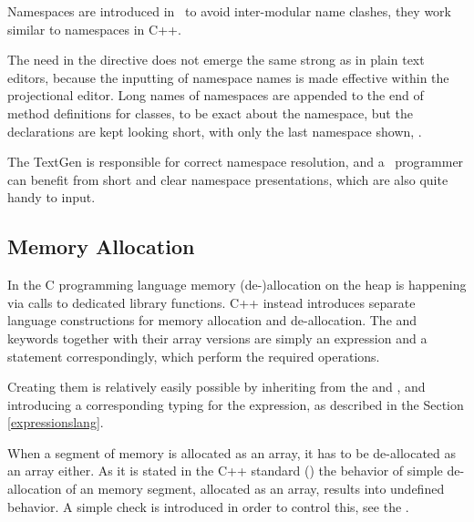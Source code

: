 Namespaces are introduced in \pcpp\ to avoid inter-modular name clashes, they work similar to 
namespaces in C++.

The need in the  directive does not emerge the same strong as in plain text editors, because the inputting of namespace names is
made effective within the projectional editor. Long names of namespaces are appended to the end of method
definitions for classes, to be exact about the namespace, but the declarations are kept looking short, with only 
the last namespace shown, .


The TextGen is responsible for correct namespace  resolution, and a \pcpp\ programmer can benefit from short and clear namespace
presentations, which are also quite handy to input.


\subsection{Memory Allocation}

In the C programming language memory (de-)allocation on the heap is happening via calls to  dedicated library functions. 
C++ instead introduces separate language constructions for memory allocation and de-allocation.  The  and  
keywords together with their array versions are simply an expression and a statement correspondingly, which perform the required operations.

Creating them is relatively easily possible by inheriting from the  and  ,
and introducing a corresponding typing for the  expression, as described in the Section \ref{expressionslang}.

When a segment of memory is allocated as an array, it has to be de-allocated as an array either.
As it is stated in the C++ standard (\cite{cpp11}) the behavior of simple de-allocation of an 
memory segment, allocated as an array, results into undefined behavior. A simple check is introduced
in order to control this, see the . 







%
%



